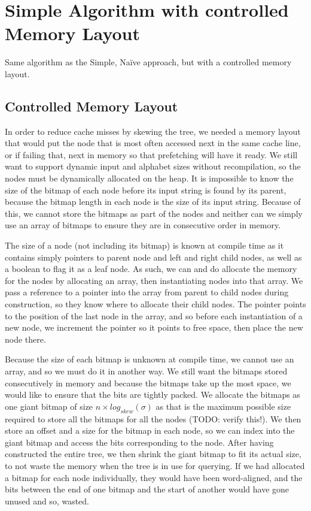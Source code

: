 \section{Simple Algorithm with controlled Memory Layout}
Same algorithm as the Simple, Naïve approach, but with a controlled memory layout.

\subsection{Controlled Memory Layout}
In order to reduce cache misses by skewing the tree, we needed a memory layout that would put the node that is most often accessed next in the same cache line, or if failing that, next in memory so that prefetching will have it ready.
We still want to support dynamic input and alphabet sizes without recompilation, so the nodes must be dynamically allocated on the heap.
It is impossible to know the size of the bitmap of each node before its input string is found by its parent, because the bitmap length in each node is the size of its input string.
Because of this, we cannot store the bitmaps as part of the nodes and neither can we simply use an array of bitmaps to ensure they are in consecutive order in memory.

The size of a node (not including its bitmap) is known at compile time as it contains simply pointers to parent node and left and right child nodes, as well as a boolean to flag it as a leaf node.
As such, we can and do allocate the memory for the nodes by allocating an array, then instantiating nodes into that array.
We pass a reference to a pointer into the array from parent to child nodes during construction, so they know where to allocate their child nodes.
The pointer points to the position of the last node in the array, and so before each instantiation of a new node, we increment the pointer so it points to free space, then place the new node there.

Because the size of each bitmap is unknown at compile time, we cannot use an array, and so we must do it in another way. We still want the bitmaps stored consecutively in memory and because the bitmaps take up the most space, we would like to ensure that the bits are tightly packed.
We allocate the bitmaps as one giant bitmap of size $n \times log_{skew}(\sigma)$ as that is the maximum possible size required to store all the bitmaps for all the nodes (TODO: verify this!). We then store an offset and a size for the bitmap in each node, so we can index into the giant bitmap and access the bits corresponding to the node.
After having constructed the entire tree, we then shrink the giant bitmap to fit its actual size, to not waste the memory when the tree is in use for querying.
If we had allocated a bitmap for each node individually, they would have been word-aligned, and the bits between the end of one bitmap and the start of another would have gone unused and so, wasted.

